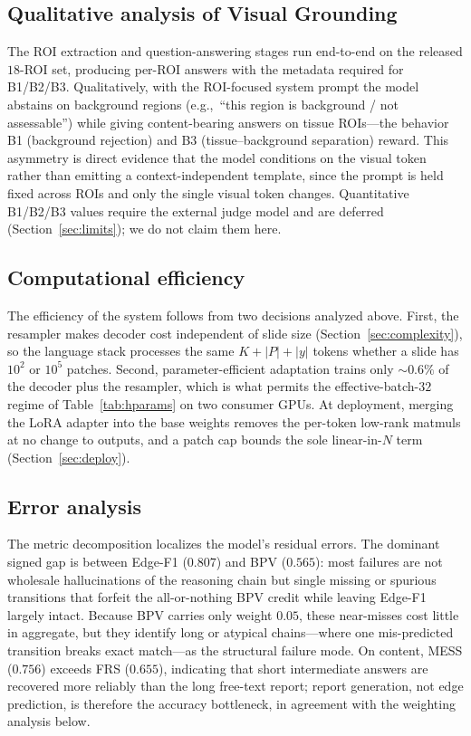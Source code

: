 \documentclass[11pt]{article}
\newcommand{\eg}{e.g.,\ }
\begin{document}
\subsection{Qualitative analysis of Visual Grounding}
The ROI extraction and question-answering stages run end-to-end on the released
$18$-ROI set, producing per-ROI answers with the metadata required for B1/B2/B3.
Qualitatively, with the ROI-focused system prompt the model abstains on background
regions (\eg ``this region is background / not assessable'') while giving
content-bearing answers on tissue ROIs---the behavior B1 (background rejection)
and B3 (tissue--background separation) reward. This asymmetry is direct evidence
that the model conditions on the visual token rather than emitting a
context-independent template, since the prompt is held fixed across ROIs and only
the single visual token changes. Quantitative B1/B2/B3 values require the external
judge model and are deferred (Section~\ref{sec:limits}); we do not claim them
here.

\subsection{Computational efficiency}
The efficiency of the system follows from two decisions analyzed above. First, the
resampler makes decoder cost independent of slide size
(Section~\ref{sec:complexity}), so the language stack processes the same
$K{+}|P|{+}|y|$ tokens whether a slide has $10^2$ or $10^5$ patches. Second,
parameter-efficient adaptation trains only $\sim\!0.6\%$ of the decoder plus the
resampler, which is what permits the effective-batch-$32$ regime of
Table~\ref{tab:hparams} on two consumer GPUs. At deployment, merging the LoRA
adapter into the base weights removes the per-token low-rank matmuls at no change
to outputs, and a patch cap bounds the sole linear-in-$N$ term
(Section~\ref{sec:deploy}).

\subsection{Error analysis}
The metric decomposition localizes the model's residual errors. The dominant
signed gap is between Edge-F1 ($0.807$) and BPV ($0.565$): most failures are not
wholesale hallucinations of the reasoning chain but single missing or spurious
transitions that forfeit the all-or-nothing BPV credit while leaving Edge-F1
largely intact. Because BPV carries only weight $0.05$, these near-misses cost
little in
aggregate, but they identify long or atypical chains---where one mis-predicted
transition breaks exact match---as the structural failure mode. On content,
MESS ($0.756$) exceeds FRS ($0.655$), indicating that short intermediate answers
are recovered more reliably than the long free-text report; report generation,
not edge prediction, is therefore the accuracy bottleneck, in agreement with the
weighting analysis below.
\end{document}
